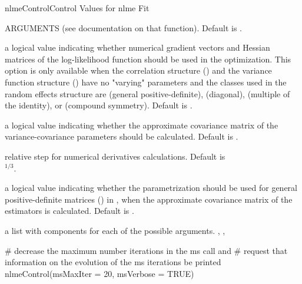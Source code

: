 \documentclass[pdftex]{article} \usepackage{url,graphicx}
\begin{document}
\begin{Helpfile}{nlmeControl}{Control Values for nlme Fit}
\begin{Argument}{ARGUMENTS}
 (see documentation on that function). Default is
.
\item[\Co{gradHess:}]
a logical value indicating whether numerical gradient
vectors and Hessian matrices of the log-likelihood function should
be used in the  optimization. This option is only available
when the correlation structure () and the variance
function structure () have no "varying" parameters and
the  classes used in the random effects structure are
 (general positive-definite),  (diagonal),
 (multiple of the identity),  or
 (compound symmetry). Default is .
\item[\Co{apVar:}]
a logical value indicating whether the approximate
covariance matrix of the variance-covariance parameters should be
calculated. Default is .
\item[\Co{.relStep:}]
relative step for numerical derivatives
calculations.
Default is \\ $^{1/3}$.
\item[\Co{natural:}]
a logical value indicating whether the 
parametrization should be used for general positive-definite matrices
() in , when the approximate covariance
matrix of the estimators is calculated. Default is .
\end{Argument}
a list with components for each of the possible arguments.
, , 
\need 15pt
\vspace{-16pt}
\begin{Example}
# decrease the maximum number iterations in the ms call and
# request that information on the evolution of the ms iterations be printed
nlmeControl(msMaxIter = 20, msVerbose = TRUE)
\end{Example}
\end{Helpfile}
\end{document}
